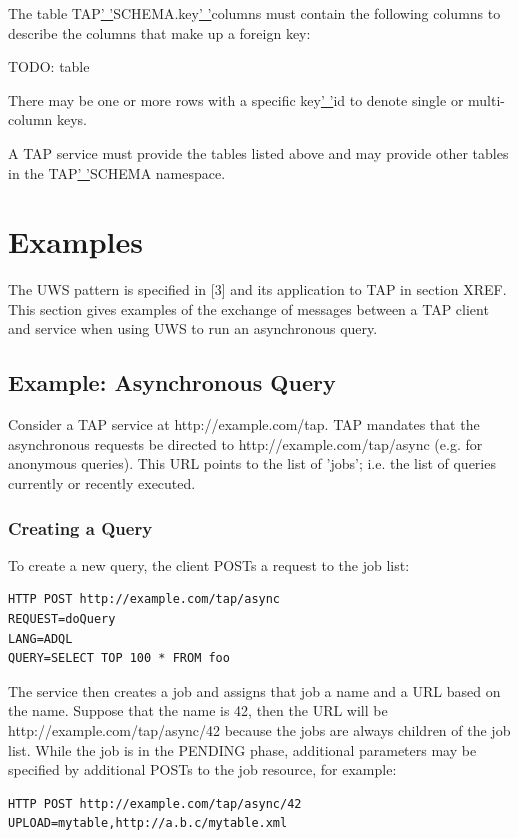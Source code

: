 \documentclass[11pt,a4paper]{ivoa}
\begin{document}
{The table TAP\underline{' '}SCHEMA.key\underline{' '}columns must contain the 
following columns to describe the columns that make up a foreign key:

TODO: table

There may be one or more rows with a specific key\underline{' '}id to 
denote single or multi-column keys.

A TAP service must provide the tables listed above and may provide other tables 
in the TAP\underline{' '}SCHEMA namespace.


\section{Examples}
The UWS pattern is specified in [3] and its application to TAP in section 
XREF. This section gives examples of the exchange of messages between a 
TAP client and service when using UWS to run an asynchronous query.

\subsection{Example: Asynchronous Query}
Consider a TAP service at http://example.com/tap. TAP mandates that the 
asynchronous requests be directed to http://example.com/tap/async (e.g. for 
anonymous queries). This URL points to the list of 'jobs'; i.e. the list of 
queries currently or recently executed.

\subsubsection{Creating a Query}
To create a new query, the client POSTs a request to the job list:

\begin{verbatim}
HTTP POST http://example.com/tap/async
REQUEST=doQuery
LANG=ADQL
QUERY=SELECT TOP 100 * FROM foo
\end{verbatim}

The service then creates a job and assigns that job a name and a URL based on 
the name. Suppose that the name is 42, then the URL will be 
http://example.com/tap/async/42 because the jobs are always children of the job 
list. While the job is in the PENDING phase, additional parameters may be 
specified by additional POSTs to the job resource, for example:

\begin{verbatim}
HTTP POST http://example.com/tap/async/42
UPLOAD=mytable,http://a.b.c/mytable.xml
\end{verbatim}

}
\end{document}
